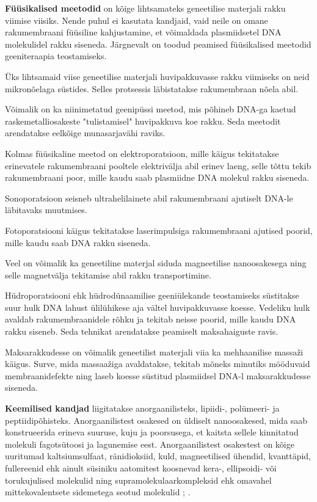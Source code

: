\documentclass{trkut}%
\begin{document}
\textbf{Füüsikalised meetodid} on kõige lihtsamateks geneetilise materjali rakku viimise viisiks. Nende puhul ei kasutata kandjaid, vaid neile on omane rakumembraani füüsiline kahjustamine, et võimaldada plasmiidsetel DNA molekulidel rakku siseneda. Järgnevalt on toodud peamised füüsikalised meetodid geeniteraapia teostamiseks.

Üks lihtsamaid viise geneetilise materjali huvipakkuvasse rakku viimiseks on neid mikro\-nõelaga süstides. Selles protsessis läbistatakse rakumembraan nõela abil.

Võimalik on ka niinimetatud geenipüssi meetod, mis põhineb DNA-ga kaetud raske\-metalliosakeste "tulistamisel" huvipakkuva koe rakku. Seda meetodit arendatakse eelkõige munasarjavähi raviks.

Kolmas füüsikaline meetod on elektroporatsioon, mille käigus tekitatakse erinevatele rakumembraani pooltele elektrivälja abil erinev laeng, selle tõttu tekib rakumembraani poor, mille kaudu saab plasmiidne DNA molekul rakku siseneda.

Sonoporatsioon seisneb ultrahelilainete abil rakumembraani ajutiselt DNA-le läbitavaks muutmises.

Fotoporatsiooni käigus tekitatakse laserimpulsiga rakumembraani ajutised poorid, mille kaudu saab DNA rakku siseneda. 

Veel on võimalik ka geneetiline materjal siduda magneetilise nanoosakesega ning selle magnetvälja tekitamise abil rakku transportimine.

Hüdroporatsiooni ehk hüdrodünaamilise geeniülekande teostamiseks süstitakse suur hulk DNA lahust ülilühikese aja vältel huvipakkuvasse koesse. Vedeliku hulk avaldab rakumembraanidele rõhku ja tekitab neisse poorid, mille kaudu DNA rakku siseneb. Seda tehnikat arendatakse peamiselt maksahaiguste ravis. \parencite{genviisid}

Maksarakkudesse on võimalik geneetilist materjali viia ka mehhaanilise massaži käigus. Surve, mida massaažiga avaldatakse, tekitab mõneks minutiks mööduvaid membraanidefekte ning laseb koesse süstitud plasmiidsel DNA-l maksarakkudesse siseneda. \parencite{MML} 

\textbf{Keemilised kandjad} liigitatakse anorgaanilisteks, lipiidi-, polümeeri- ja peptiidipõhisteks. Anorgaanilistest osakesed on üldiselt nanoosakesed, mida saab konstrueerida erineva suuruse, kuju ja poorsusega, et kaitsta sellele kinnitatud molekuli fagotsütoosi ja lagunemise eest. Anorgaanilistest osakestest on kõige uuritumad kaltsiumsulfaat, ränidioksiid, kuld, magneetilised ühendid, kvanttäpid, fullereenid ehk ainult süsiniku aatomitest koosnevad kera-, ellipsoidi- või torukujulised molekulid ning supramolekulaarkompleksid ehk omavahel mittekovalentsete sidemetega seotud molekulid \parencite{fullereen}; \parencite{kompleks}.
\end{document}
